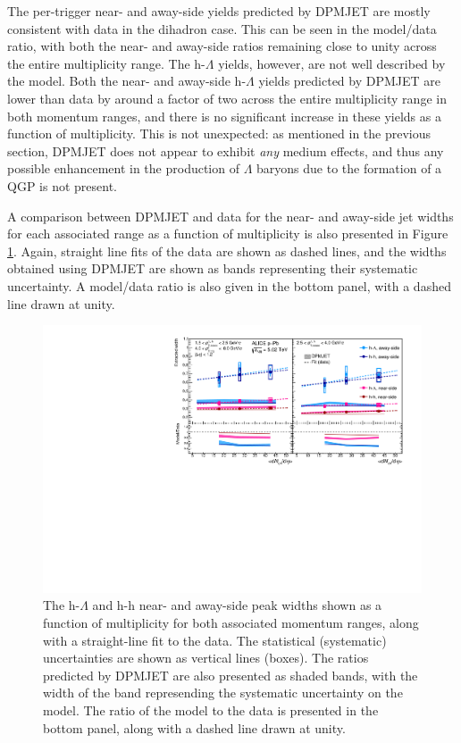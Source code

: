 The per-trigger near- and away-side yields predicted by DPMJET are mostly consistent with data in the dihadron case. This can be seen in the model/data ratio, with both the near- and away-side ratios remaining close to unity across the entire multiplicity range. The h-$\Lambda$ yields, however, are not well described by the model. Both the near- and away-side h-$\Lambda$ yields predicted by DPMJET are lower than data by around a factor of two across the entire multiplicity range in both momentum ranges, and there is no significant increase in these yields as a function of multiplicity. This is not unexpected: as mentioned in the previous section, DPMJET does not appear to exhibit \textit{any} medium effects, and thus any possible enhancement in the production of $\Lambda$ baryons due to the formation of a QGP is not present.

A comparison between DPMJET and data for the near- and away-side jet widths for each associated \pt range as a function of multiplicity is also presented in Figure \ref{fig:jet_widths_model}. Again, straight line fits of the data are shown as dashed lines, and the widths obtained using DPMJET are shown as bands representing their systematic uncertainty. A model/data ratio is also given in the bottom panel, with a dashed line drawn at unity.


\begin{figure}[h!]
\centering
\includegraphics[width=\textwidth]{figures/results/final_width_plot_new_x_axis_model_ratio.pdf}
\caption{The h-$\Lambda$ and h-h near- and away-side peak widths shown as a function of multiplicity for both associated momentum ranges, along with a straight-line fit to the data. The statistical (systematic) uncertainties are shown as vertical lines (boxes). The ratios predicted by DPMJET are also presented as shaded bands, with the width of the band represending the systematic uncertainty on the model. The ratio of the model to the data is presented in the bottom panel, along with a dashed line drawn at unity.}
\label{fig:jet_widths_model}
\end{figure}

